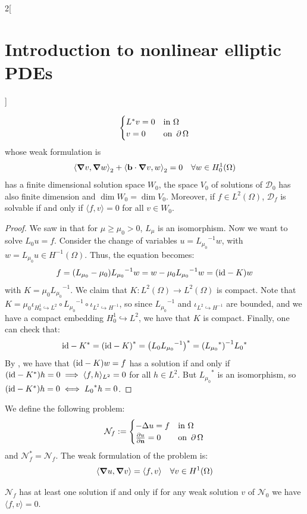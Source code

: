\documentclass[../../../main_math.tex]{subfiles}
\begin{document}
\begin{multicols}{2}[\section{Introduction to nonlinear elliptic PDEs}]
\begin{proposition}
$$\begin{cases}
        L^*v=0 & \text{in }\Omega      \\
        v=0    & \text{on }\operatorname{\partial}{\Omega}
      \end{cases}
    $$
    whose weak formulation is
    \begin{equation*}
      {\langle \grad v,\grad w\rangle}_2+{\langle \boldsymbol{\mathrm{b}}\cdot \grad v,w\rangle}_2=0\quad \forall w\in H_0^1(\Omega)
    \end{equation*}
    has a finite dimensional solution space $W_0$, the space $V_0$ of solutions of $\mathcal{D}_0$ has also finite dimension and $\dim W_0=\dim V_0$. Moreover, if $f\in L^2(\Omega)$, $\mathcal{D}_f$ is solvable if and only if $\langle f,v\rangle=0$ for all $v\in W_0$.
  \end{proposition}
  \begin{proof}
    We saw in  that for $\mu\geq \mu_0>0$, $L_\mu$ is an isomorphism. Now we want to solve $L_0u=f$. Consider the change of variables $u={L_{\mu_0}}^{-1}w$, with $w=L_{\mu_0}u\in H^{-1}(\Omega)$. Thus, the equation becomes:
    $$
      f= (L_{\mu_0}-\mu_0){L_{\mu_0}}^{-1}w=w-\mu_0 {L_{\mu_0}}^{-1}w=(\mathrm{id}-K)w
    $$
    with $K=\mu_0 {L_{\mu_0}}^{-1}$. We claim that $K:L^2(\Omega)\to L^2(\Omega)$ is compact. Note that $K=\mu_0\iota_{H_0^1\hookrightarrow L^2}\circ {L_{\mu_0}}^{-1}\circ \iota_{L^2\hookrightarrow H^{-1}}$, so since ${L_{\mu_0}}^{-1}$ and $\iota_{L^2\hookrightarrow H^{-1}}$ are bounded, and we have a compact embedding $H_0^1\hookrightarrow L^2$, we have that $K$ is compact. Finally, one can check that:
    $$
      \mathrm{id}-K^*={(\mathrm{id}-K)}^*={\left(L_0{L_{\mu_0}}^{-1}\right)}^*={({L_{\mu_0}}^*)}^{-1}{L_0}^{*}
    $$
    By , we have that $(\mathrm{id}-K)w=f$ has a solution if and only if $(\mathrm{id}-K^*)h=0\implies \langle f,h\rangle_{L^2} =0$ for all $h\in L^2$. But ${L_{\mu_0}}^*$ is an isomorphism, so $(\mathrm{id}-K^*)h=0\iff {L_0}^*h=0$.
  \end{proof}
  \begin{definition}
    We define the following problem:
    $$
      \mathcal{N}_f:=\begin{cases}
        -\Delta u=f   & \text{in }\Omega      \\
        \pdv{u}{\boldsymbol{\mathrm{n}}}=0 & \text{on }\operatorname{\partial}{\Omega}
      \end{cases}
    $$
    and $\mathcal{N}_f^*=\mathcal{N}_f$. The weak formulation of the problem is:
    \begin{equation*}
      \langle \grad u,\grad v\rangle=\langle f,v\rangle\quad \forall v\in H^1(\Omega)
    \end{equation*}
  \end{definition}
  \begin{proposition}
    $\mathcal{N}_f$ has at least one solution if and only if for any weak solution $v$ of $\mathcal{N}_0$ we have $\langle f,v\rangle=0$.
  \end{proposition}

\end{multicols}
\end{document}

